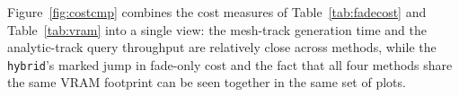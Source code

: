 Figure~\ref{fig:costcmp} combines the cost measures of Table~\ref{tab:fadecost} and Table~\ref{tab:vram} into a single view: the mesh-track generation time and the analytic-track query throughput are relatively close across methods, while the \texttt{hybrid}'s marked jump in fade-only cost and the fact that all four methods share the same VRAM footprint can be seen together in the same set of plots.
